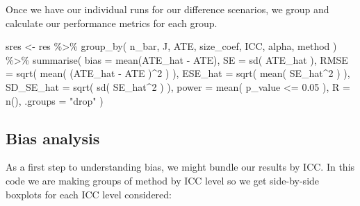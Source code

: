 \documentclass[
]{book}
\newenvironment{Shaded}{\begin{snugshade}}{\end{snugshade}}
\newcommand{\AttributeTok}[1]{\textcolor[rgb]{0.77,0.63,0.00}{#1}}
\newcommand{\ConstantTok}[1]{\textcolor[rgb]{0.00,0.00,0.00}{#1}}
\newcommand{\DecValTok}[1]{\textcolor[rgb]{0.00,0.00,0.81}{#1}}
\newcommand{\FloatTok}[1]{\textcolor[rgb]{0.00,0.00,0.81}{#1}}
\newcommand{\FunctionTok}[1]{\textcolor[rgb]{0.00,0.00,0.00}{#1}}
\newcommand{\NormalTok}[1]{#1}
\newcommand{\OtherTok}[1]{\textcolor[rgb]{0.56,0.35,0.01}{#1}}
\newcommand{\SpecialCharTok}[1]{\textcolor[rgb]{0.00,0.00,0.00}{#1}}
\newcommand{\StringTok}[1]{\textcolor[rgb]{0.31,0.60,0.02}{#1}}
\begin{document}
Once we have our individual runs for our difference scenarios, we group and calculate our performance metrics for each group.

\begin{Shaded}
\begin{Highlighting}[]
\NormalTok{sres }\OtherTok{\textless{}{-}} 
\NormalTok{  res }\SpecialCharTok{\%\textgreater{}\%} 
  \FunctionTok{group\_by}\NormalTok{( n\_bar, J, ATE, size\_coef, ICC, alpha, method ) }\SpecialCharTok{\%\textgreater{}\%}
  \FunctionTok{summarise}\NormalTok{( }
    \AttributeTok{bias =} \FunctionTok{mean}\NormalTok{(ATE\_hat }\SpecialCharTok{{-}}\NormalTok{ ATE),}
    \AttributeTok{SE =} \FunctionTok{sd}\NormalTok{( ATE\_hat ),}
    \AttributeTok{RMSE =} \FunctionTok{sqrt}\NormalTok{( }\FunctionTok{mean}\NormalTok{( (ATE\_hat }\SpecialCharTok{{-}}\NormalTok{ ATE )}\SpecialCharTok{\^{}}\DecValTok{2}\NormalTok{ ) ),}
    \AttributeTok{ESE\_hat =} \FunctionTok{sqrt}\NormalTok{( }\FunctionTok{mean}\NormalTok{( SE\_hat}\SpecialCharTok{\^{}}\DecValTok{2}\NormalTok{ ) ),}
    \AttributeTok{SD\_SE\_hat =} \FunctionTok{sqrt}\NormalTok{( }\FunctionTok{sd}\NormalTok{( SE\_hat}\SpecialCharTok{\^{}}\DecValTok{2}\NormalTok{ ) ),}
    \AttributeTok{power =} \FunctionTok{mean}\NormalTok{( p\_value }\SpecialCharTok{\textless{}=} \FloatTok{0.05}\NormalTok{ ),}
    \AttributeTok{R =} \FunctionTok{n}\NormalTok{(),}
    \AttributeTok{.groups =} \StringTok{"drop"}
\NormalTok{  )}
\end{Highlighting}
\end{Shaded}

\hypertarget{bias-analysis}{%
\subsection{Bias analysis}\label{bias-analysis}}

As a first step to understanding bias, we might bundle our results by ICC.
In this code we are making groups of method by ICC level so we get side-by-side boxplots for each ICC level considered:

\begin{Shaded}
\end{Shaded}
\end{document}
